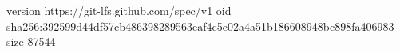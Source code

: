 version https://git-lfs.github.com/spec/v1
oid sha256:392599d44df57cb486398289563eaf4c5e02a4a51b186608948bc898fa406983
size 87544
